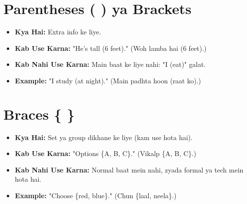 \documentclass[a4paper, 12pt]{article}
\begin{document}

\section{Parentheses ( ) ya Brackets}
\begin{itemize}
    \item \textbf{\color{importantred}Kya Hai:} Extra info ke liye.  
    \item \textbf{\color{keyconceptgreen}Kab Use Karna:} "He’s tall (6 feet)." (Woh lamba hai (6 feet).)  
    \item \textbf{\color{importantred}Kab Nahi Use Karna:} Main baat ke liye nahi: "I (eat)" galat.  
    \item \textbf{Example:} "I study (at night)." (Main padhta hoon (raat ko).)
\end{itemize}

\section{Braces \{ \}}
\begin{itemize}
    \item \textbf{\color{importantred}Kya Hai:} Set ya group dikhane ke liye (kam use hota hai).  
    \item \textbf{\color{keyconceptgreen}Kab Use Karna:} "Options \{A, B, C\}." (Vikalp \{A, B, C\}.)  
    \item \textbf{\color{importantred}Kab Nahi Use Karna:} Normal baat mein nahi, zyada formal ya tech mein hota hai.  
    \item \textbf{Example:} "Choose \{red, blue\}." (Chun \{laal, neela\}.)
\end{itemize}


\end{document}
\end{document}
\end{document}
\end{document}
\end{document}
\end{itemize}
\end{document}
